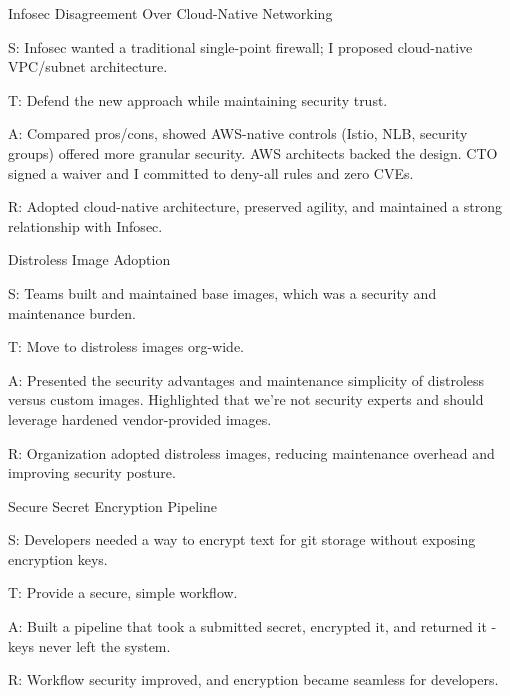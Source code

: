 \documentclass[11pt]{article}
\begin{document}
\begin{starstory}{Infosec Disagreement Over Cloud-Native Networking}
\begin{starlist}
\item[S:] Infosec wanted a traditional single-point firewall; I proposed cloud-native VPC/subnet architecture.
\item[T:] Defend the new approach while maintaining security trust.
\item[A:] Compared pros/cons, showed AWS-native controls (Istio, NLB, security groups) offered more granular security. AWS architects backed the design. CTO signed a waiver and I committed to deny-all rules and zero CVEs.
\item[R:] Adopted cloud-native architecture, preserved agility, and maintained a strong relationship with Infosec.
\end{starlist}
\end{starstory}

\begin{starstory}{Distroless Image Adoption}
\begin{starlist}
\item[S:] Teams built and maintained base images, which was a security and maintenance burden.
\item[T:] Move to distroless images org-wide.
\item[A:] Presented the security advantages and maintenance simplicity of distroless versus custom images. Highlighted that we're not security experts and should leverage hardened vendor-provided images.
\item[R:] Organization adopted distroless images, reducing maintenance overhead and improving security posture.
\end{starlist}
\end{starstory}

\begin{starstory}{Secure Secret Encryption Pipeline}
\begin{starlist}
\item[S:] Developers needed a way to encrypt text for git storage without exposing encryption keys.
\item[T:] Provide a secure, simple workflow.
\item[A:] Built a pipeline that took a submitted secret, encrypted it, and returned it - keys never left the system.
\item[R:] Workflow security improved, and encryption became seamless for developers.
\end{starlist}
\end{starstory}
\end{document}
